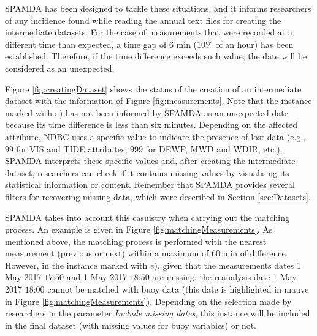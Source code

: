 \documentclass[energies,article,accept,moreauthors,pdftex]{Definitions/mdpi}
\begin{document}
\begin{paracol}{2}
		
		SPAMDA has been designed to tackle these situations, and it informs researchers of any incidence found while reading the annual text files for creating the intermediate datasets. For the case of measurements that were recorded at a different time than expected, a time gap of 6 min ($10\%$ of an hour) has been established. Therefore, if the time difference exceeds such value, the date will be considered as an unexpected.
		
		Figure \ref{fig:creatingDataset} shows the status of the creation of an intermediate dataset with the information of Figure \ref{fig:measurements}. Note that the instance marked with a) has not been informed by SPAMDA as an unexpected date because its time difference is less than six minutes. Depending on the affected attribute, NDBC uses a specific value \cite{NOAA_3} to indicate the presence of lost data (e.g., $99$ for VIS and TIDE attributes, $999$ for DEWP, MWD and WDIR, etc.). SPAMDA interprets these specific values and, after creating the intermediate dataset, researchers can check if it contains missing values by visualising its statistical information or content. Remember that SPAMDA provides several filters for recovering missing data, which were described in Section \ref{sec:Datasets}.
		
		SPAMDA takes into account this casuistry when carrying out the matching process. An example is given in Figure \ref{fig:matchingMeasurements}. As mentioned above, the matching process is performed with the nearest measurement (previous or next) within a maximum of 60 min of difference. However, in the instance marked with $e)$, given that the measurements dates 1 May 2017 $17$:$50$ and 1 May 2017 $18$:$50$ are missing, the reanalysis date 1 May 2017 $18$:$00$ cannot be matched with buoy data (this date is highlighted in mauve in Figure \ref{fig:matchingMeasurements}). Depending on the selection made by researchers in the parameter \textit{Include missing dates}, this instance will be included in the final dataset (with missing values for buoy variables) or not.
		
\end{paracol}
\nointerlineskip
\appendix
\end{document}
